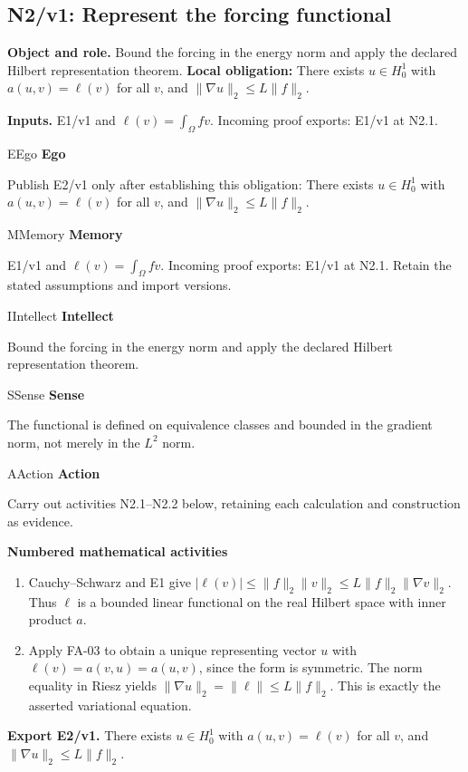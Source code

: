 \documentclass[preprint,12pt,aps,pra,showkeys,amsmath,amssymb,superscriptaddress,floatfix]{revtex4-2}
\theoremstyle{definition}
\theoremstyle{remark}
\newcommand{\mmfaculty}[3]{%
 \begin{mmfacultybox}{#1}{#2}
 {\sffamily\bfseries\color{MMBlue}#2}\par\smallskip #3
 \end{mmfacultybox}}
\newcommand{\field}[2]{\par\smallskip\noindent\textbf{#1.} #2\par}
\begin{document}
\clearpage

\subsection{N2/v1: Represent the forcing functional}

\field{Object and role}{Bound the forcing in the energy norm and apply the declared Hilbert
representation theorem. \textbf{Local obligation:} There exists
\(u\in H_0^1\) with \(a(u,v)=\ell(v)\) for all \(v\), and
\(\|\nabla u\|_2\le L\|f\|_2\).}

\field{Inputs}{E1/v1 and \(\ell(v)=\int_\Omega fv\). Incoming proof exports: E1/v1 at
N2.1.}

\mmfaculty{E}{Ego}{Publish E2/v1 only after establishing this obligation: There exists
\(u\in H_0^1\) with \(a(u,v)=\ell(v)\) for all \(v\), and
\(\|\nabla u\|_2\le L\|f\|_2\).}

\mmfaculty{M}{Memory}{E1/v1 and \(\ell(v)=\int_\Omega fv\). Incoming proof exports: E1/v1 at
N2.1. Retain the stated assumptions and import versions.}

\mmfaculty{I}{Intellect}{Bound the forcing in the energy norm and apply the declared Hilbert
representation theorem.}

\mmfaculty{S}{Sense}{The functional is defined on equivalence classes and bounded in the
gradient norm, not merely in the \(L^2\) norm.}

\mmfaculty{A}{Action}{Carry out activities N2.1--N2.2 below, retaining each calculation and
construction as evidence.}

\smallskip\noindent\textbf{Numbered mathematical activities}

\begin{enumerate}[label=N2.\arabic*,leftmargin=3.4em]

\item Cauchy--Schwarz and E1 give
\(|\ell(v)|\le\|f\|_2\|v\|_2\le L\|f\|_2\|\nabla v\|_2\). Thus \(\ell\)
is a bounded linear functional on the real Hilbert space with inner
product \(a\).

\item Apply FA-03 to obtain a unique representing vector \(u\) with
\(\ell(v)=a(v,u)=a(u,v)\), since the form is symmetric. The norm
equality in Riesz yields \(\|\nabla u\|_2=\|\ell\|\le L\|f\|_2\). This
is exactly the asserted variational equation.

\end{enumerate}

\field{Export E2/v1}{There exists \(u\in H_0^1\) with \(a(u,v)=\ell(v)\) for all \(v\), and
\(\|\nabla u\|_2\le L\|f\|_2\).}
\end{document}
